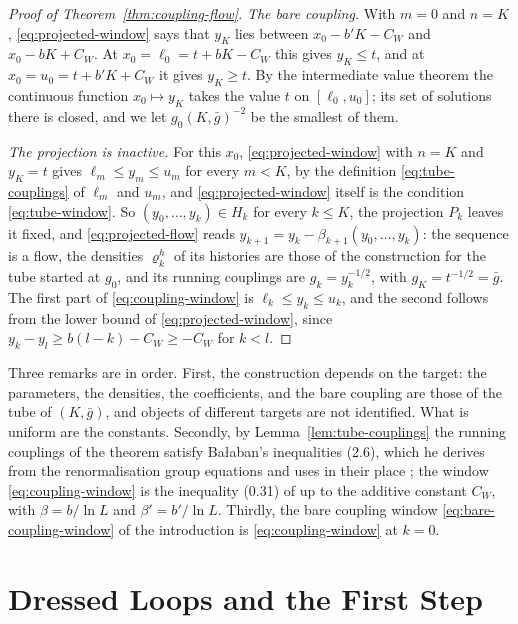 \documentclass[11pt]{preprint}
\numberwithin{equation}{section}
\theoremstyle{definition}
\theoremstyle{remark}
\theoremstyle{plain}
\begin{document}
\begin{proof}[Proof of Theorem~\ref{thm:coupling-flow}]
\emph{The bare coupling.} With $m = 0$ and $n = K$, \eqref{eq:projected-window} says that $y_K$ lies between $x_0 - b'K - C_W$ and $x_0 - bK + C_W$. At $x_0 = \ell_0 = t + bK - C_W$ this gives $y_K \leq t$, and at $x_0 = u_0 = t + b'K + C_W$ it gives $y_K \geq t$. By the intermediate value theorem the continuous function $x_0 \mapsto y_K$ takes the value $t$ on $[\ell_0, u_0]$; its set of solutions there is closed, and we let $g_0(K, \bar g)^{-2}$ be the smallest of them.

\emph{The projection is inactive.} For this $x_0$, \eqref{eq:projected-window} with $n = K$ and $y_K = t$ gives $\ell_m \leq y_m \leq u_m$ for every $m < K$, by the definition \eqref{eq:tube-couplings} of $\ell_m$ and $u_m$, and \eqref{eq:projected-window} itself is the condition \eqref{eq:tube-window}. So $(y_0, \dots, y_k) \in H_k$ for every $k \leq K$, the projection $P_k$ leaves it fixed, and \eqref{eq:projected-flow} reads $y_{k+1} = y_k - \beta_{k+1}(y_0, \dots, y_k)$: the sequence is a flow, the densities $\varrho^h_k$ of its histories are those of the construction for the tube started at $g_0$, and its running couplings are $g_k = y_k^{-1/2}$, with $g_K = t^{-1/2} = \bar g$. The first part of \eqref{eq:coupling-window} is $\ell_k \leq y_k \leq u_k$, and the second follows from the lower bound of \eqref{eq:projected-window}, since $y_k - y_l \geq b(l - k) - C_W \geq -C_W$ for $k < l$.
\end{proof}

Three remarks are in order. First, the construction depends on the target: the parameters, the densities, the coefficients, and the bare coupling are those of the tube of $(K, \bar g)$, and objects of different targets are not identified. What is uniform are the constants. Secondly, by Lemma~\ref{lem:tube-couplings} the running couplings of the theorem satisfy Ba{\l}aban's inequalities (2.6), which he derives from the renormalisation group equations and uses in their place \cite[p.~255]{BalabanCRE}; the window \eqref{eq:coupling-window} is the inequality (0.31) of \cite{BalabanRG1} up to the additive constant $C_W$, with $\beta = b/\ln L$ and $\beta' = b'/\ln L$. Thirdly, the bare coupling window \eqref{eq:bare-coupling-window} of the introduction is \eqref{eq:coupling-window} at $k = 0$.

\section{Dressed Loops and the First Step}\label{sec:first-step}
\end{document}
